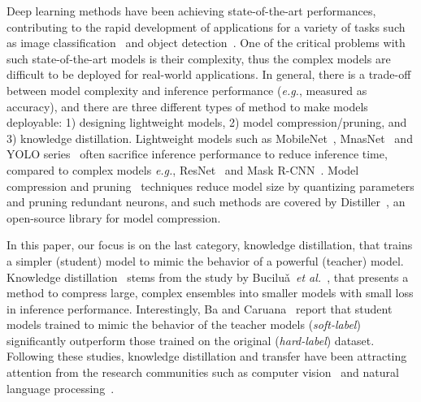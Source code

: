 \documentclass[runningheads]{llncs}
\begin{document}
Deep learning methods have been achieving state-of-the-art performances, contributing to the rapid development of applications for a variety of tasks such as image classification~\cite{he2016deep,mahajan2018exploring,tan2019efficientnet,touvron2019fixing} and object detection~\cite{ren2015faster,he2017mask,carion2020end}. 
One of the critical problems with such state-of-the-art models is their complexity, thus the complex models are difficult to be deployed for real-world applications.
In general, there is a trade-off between model complexity and inference performance (\emph{e.g.}, measured as accuracy), and there are three different types of method to make models deployable: 1) designing lightweight models, 2) model compression/pruning, and 3) knowledge distillation.
Lightweight models such as MobileNet~\cite{sandler2018mobilenetv2,howard2019searching}, MnasNet~\cite{tan2019mnasnet} and YOLO series~\cite{redmon2017yolo9000,redmon2018yolov3} often sacrifice inference performance to reduce inference time, compared to complex models \emph{e.g.}, ResNet~\cite{he2016deep} and Mask R-CNN~\cite{he2017mask}.
Model compression and pruning~\cite{han2016deep,li2016pruning} techniques reduce model size by quantizing parameters and pruning redundant neurons, and such methods are covered by Distiller~\cite{zmora2019neural}, an open-source library for model compression.

In this paper, our focus is on the last category, knowledge distillation, that trains a simpler (student) model to mimic the behavior of a powerful (teacher) model.
Knowledge distillation~\cite{hinton14distilling} stems from the study by Bucilu\v{a}~\emph{et al.}~\cite{bucilua2006model}, that presents a method to compress large, complex ensembles into smaller models with small loss in inference performance.
Interestingly, Ba and Caruana~\cite{ba2014deep} report that student models trained to mimic the behavior of the teacher models (\emph{soft-label}) significantly outperform those trained on the original (\emph{hard-label}) dataset.
Following these studies, knowledge distillation and transfer have been attracting attention from the research communities such as computer vision~\cite{romero2015fitnets} and natural language processing~\cite{sanh2019distilbert}.
\end{document}
